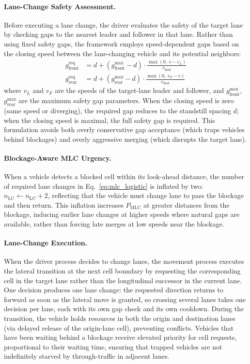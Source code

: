 \documentclass[review,authoryear]{elsarticle}
\begin{document}
\paragraph{Lane-Change Safety Assessment.}
Before executing a lane change, the driver evaluates the safety of the target lane by checking gaps to the nearest leader and follower in that lane. Rather than using fixed safety gaps, the framework employs speed-dependent gaps based on the closing speed between the lane-changing vehicle and its potential neighbors:
\begin{align}
    g_{\text{front}}^{\text{req}} &= d + (g_{\text{front}}^{\max} - d) \cdot \frac{\max(0,\; v - v_L)}{v_{\max}} \label{eq:front_gap} \\
    g_{\text{rear}}^{\text{req}} &= d + (g_{\text{rear}}^{\max} - d) \cdot \frac{\max(0,\; v_F - v)}{v_{\max}} \label{eq:rear_gap}
\end{align}
where $v_L$ and $v_F$ are the speeds of the target-lane leader and follower, and $g_{\text{front}}^{\max}$, $g_{\text{rear}}^{\max}$ are the maximum safety gap parameters. When the closing speed is zero (same speed or diverging), the required gap reduces to the standstill spacing $d$; when the closing speed is maximal, the full safety gap is required. This formulation avoids both overly conservative gap acceptance (which traps vehicles behind blockages) and overly aggressive merging (which disrupts the target lane).

\paragraph{Blockage-Aware MLC Urgency.}
When a vehicle detects a blocked cell within its look-ahead distance, the number of required lane changes in Eq.~\eqref{eq:mlc_logistic} is inflated by two: $n_{\text{LC}} \leftarrow n_{\text{LC}} + 2$, reflecting that the vehicle must change lane to pass the blockage and then return. This inflation increases $P_{\text{MLC}}$ at greater distances from the blockage, inducing earlier lane changes at higher speeds where natural gaps are available, rather than forcing late merges at low speeds near the blockage.

\paragraph{Lane-Change Execution.}
When the driver process decides to change lanes, the movement process executes the lateral transition at the next cell boundary by requesting the corresponding cell in the target lane rather than the longitudinal successor in the current lane. One decision produces one lane change: the requested direction returns to forward as soon as the lateral move is granted, so crossing several lanes takes one decision per lane, each with its own gap check and its own cooldown. During the transition, the vehicle holds resources in both the origin and destination lanes (via delayed release of the origin-lane cell), preventing conflicts. Vehicles that have been waiting behind a blockage receive elevated priority for cell requests, proportional to their waiting time, ensuring that trapped vehicles are not indefinitely starved by through-traffic in adjacent lanes.
\end{document}
